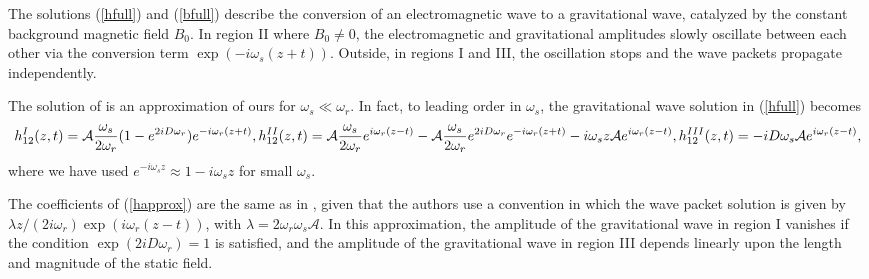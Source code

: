 \documentclass[12pt]{article}
\def\\{\hfill\break} \let\==\equiv
\begin{document}
The solutions (\ref{hfull}) and (\ref{bfull}) describe the conversion of an electromagnetic wave to a gravitational wave, catalyzed by the constant background magnetic field $B_0$. In region II where $B_0 \neq 0$, the electromagnetic and gravitational amplitudes slowly oscillate between each other via the conversion term $\exp(-i\omega_s(z+t))$. Outside, in regions I and III, the oscillation stops and the wave packets propagate independently.

The solution of \cite{Bocc70} is an approximation of ours for $\omega_s \ll \omega_r$. In fact, to leading order in $\omega_s$, the gravitational wave solution in (\ref{hfull}) becomes
\begin{equation}\label{happrox}
    \begin{split}
        h_{12}^I(z,t) = \mathcal{A} \frac{\omega_s}{2\omega_r}(1-e^{2iD\omega_r}) e^{-i\omega_r(z+t)}, \\
        h_{12}^{II}(z,t) = \mathcal{A} \frac{\omega_s}{2\omega_r} e^{i\omega_r(z-t)} - \mathcal{A} \frac{\omega_s}{2\omega_r} e^{2iD\omega_r}e^{-i\omega_r(z+t)} - i \omega_s z \mathcal{A} e^{i\omega_r(z-t)}, \\
        h_{12}^{III}(z,t) = - i D \omega_s \mathcal{A} e^{i\omega_r(z-t)},
    \end{split}
\end{equation}
where we have used  $e^{-i\omega_s z} \approx 1 - i \omega_s z$  for small $\omega_s$.

The coefficients of (\ref{happrox}) are the same as in \cite{Bocc70}, given that the authors use a convention in which the wave packet solution is given by $\lambda z/(2i\omega_r) \exp(i\omega_r(z-t))$, with $\lambda = 2 \omega_r \omega_s \mathcal{A}$. In this approximation, the amplitude of the gravitational wave in region I vanishes if the condition $\exp(2iD\omega_r) = 1$ is satisfied, and the amplitude of the gravitational wave in region III depends linearly upon the length and magnitude of the static field.
\end{document}
